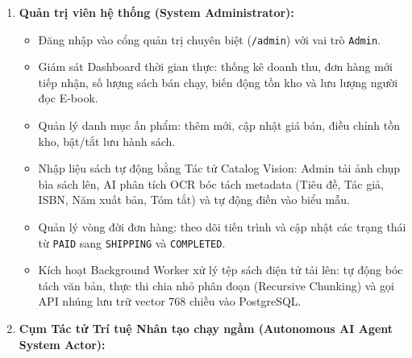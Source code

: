 \documentclass[11pt, a4paper]{report}
\begin{document}
\begin{enumerate}
\begin{itemize}
        \item Sau khi thanh toán thành công qua cổng Sandbox, Webhook IPN kích hoạt giao dịch CSDL chuyển trạng thái đơn sang \texttt{PAID}, xác nhận trừ kho vĩnh viễn và cấp phát bản quyền đọc sách điện tử vào bảng \texttt{ebook\_accesses}.
        \item Độc giả truy cập Thư viện số cá nhân, mở không gian đọc E-book bảo mật DRM (WASM Canvas). Trong quá trình đọc, độc giả có thể tùy chỉnh cỡ chữ, nền đọc (Sáng/Sepia/Tối), lưu tiến độ đọc dở dang và kích hoạt khung chat đối thoại với Tác tử RAG Companion để hỏi đáp chuyên sâu kèm dẫn chứng số trang.
        \item Khách hàng có thể kích hoạt biểu tượng Micro nổi trên màn hình để ra lệnh thoại cho Tác tử Voice AI thực hiện tra cứu hành trình hoặc gửi yêu cầu hủy đơn hàng (nếu đơn chưa chuyển sang \texttt{SHIPPING}).
        \item Sau khi hoàn tất đơn hàng, khách hàng có thể gửi đánh giá xếp hạng sao và bình luận nhận xét về ấn phẩm.
    \end{itemize}
    \item \textbf{Quản trị viên hệ thống (System Administrator):}
    \begin{itemize}
        \item Đăng nhập vào cổng quản trị chuyên biệt (\texttt{/admin}) với vai trò \texttt{Admin}.
        \item Giám sát Dashboard thời gian thực: thống kê doanh thu, đơn hàng mới tiếp nhận, số lượng sách bán chạy, biến động tồn kho và lưu lượng người đọc E-book.
        \item Quản lý danh mục ấn phẩm: thêm mới, cập nhật giá bán, điều chỉnh tồn kho, bật/tắt lưu hành sách.
        \item Nhập liệu sách tự động bằng Tác tử Catalog Vision: Admin tải ảnh chụp bìa sách lên, AI phân tích OCR bóc tách metadata (Tiêu đề, Tác giả, ISBN, Năm xuất bản, Tóm tắt) và tự động điền vào biểu mẫu.
        \item Quản lý vòng đời đơn hàng: theo dõi tiến trình và cập nhật các trạng thái từ \texttt{PAID} sang \texttt{SHIPPING} và \texttt{COMPLETED}.
        \item Kích hoạt Background Worker xử lý tệp sách điện tử tải lên: tự động bóc tách văn bản, thực thi chia nhỏ phân đoạn (Recursive Chunking) và gọi API nhúng lưu trữ vector 768 chiều vào PostgreSQL.
    \end{itemize}
    \item \textbf{Cụm Tác tử Trí tuệ Nhân tạo chạy ngầm (Autonomous AI Agent System Actor):}

\end{enumerate}
\end{document}
